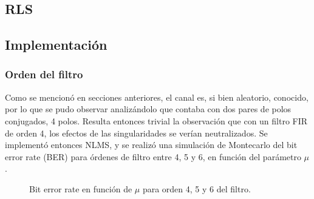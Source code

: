 \documentclass[main.tex]{subfiles}
\begin{document}
\subsection*{RLS}
\subsection*{Implementación}
\subsubsection*{Orden del filtro}
Como se mencionó en secciones anteriores, el canal es, si bien aleatorio, conocido, por 
lo que se pudo observar analizándolo que contaba con dos pares de polos conjugados, 4 polos.
Resulta entonces trivial la observación que con un filtro FIR de orden 4, los efectos 
de las singularidades se verían neutralizados. Se implementó entonces NLMS, y se realizó
una simulación de Montecarlo del bit error rate (BER) para órdenes de filtro entre 4, 5 y 6, en función del parámetro 
$\mu$.

\begin{figure}[H]
    \centering
    \caption{Bit error rate en función de $\mu$ para orden 4, 5 y 6 del filtro.}
\end{figure}
\end{document}

